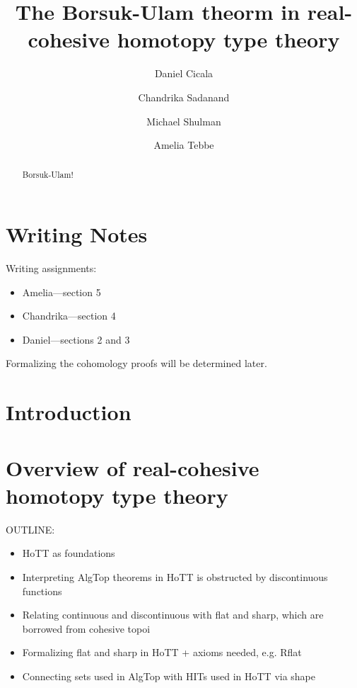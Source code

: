 \documentclass{amsart}
\begin{document}
\title{%
        The Borsuk-Ulam theorm in real-cohesive homotopy
        type theory}   
\author{%
        Daniel Cicala \and Chandrika Sadanand \and Michael
        Shulman \and Amelia Tebbe}
\begin{abstract}
        Borsuk-Ulam!
\end{abstract}
\maketitle

\section*{Writing Notes}
\label{sec:writing_notes}

Writing assignments:
\begin{itemize}
\item Amelia---section 5
\item Chandrika---section 4
\item Daniel---sections 2 and 3
\end{itemize}

Formalizing the cohomology proofs will be determined later.


\section{Introduction}
\label{sec:intro}

\section{Overview of real-cohesive homotopy type theory}
\label{sec:rc-hott}

OUTLINE:
\begin{itemize}
\item
  HoTT as foundations
\item
  Interpreting AlgTop theorems in HoTT is obstructed by
  discontinuous functions
\item
  Relating continuous and discontinuous with flat and
  sharp, which are borrowed from cohesive topoi
\item
  Formalizing flat and sharp in HoTT + axioms needed,
  e.g. Rflat
\item
  Connecting sets used in AlgTop with HITs used in HoTT
  via shape
\end{itemize}
\end{document}
